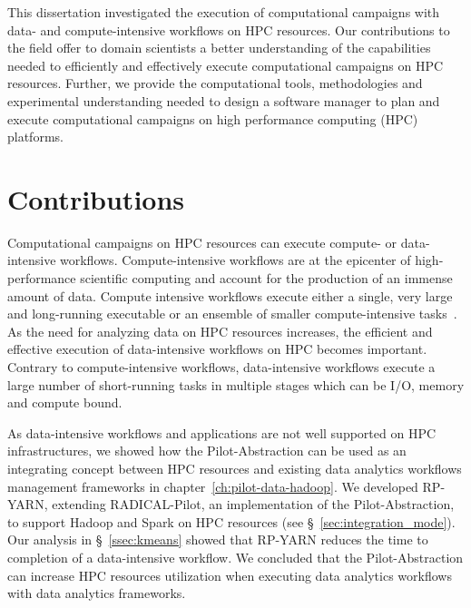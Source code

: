 
This dissertation investigated the execution of computational campaigns with
data- and compute-intensive workflows on HPC resources. Our contributions to 
the field offer to domain scientists a better understanding of the capabilities 
needed to efficiently and effectively execute computational campaigns on HPC 
resources. Further, we provide the computational tools, methodologies and 
experimental understanding needed to design a software manager to plan and 
execute computational campaigns on high performance computing (HPC) platforms.

\section{Contributions}

Computational campaigns on HPC resources can execute compute- or data- intensive
workflows. Compute-intensive workflows are at the epicenter of high-performance
scientific computing and account for the production of an immense amount of
data. Compute intensive workflows execute either a single, very large and
long-running executable or an ensemble of smaller compute-intensive
tasks~\cite{balasubramanian2018harnessing}. As the need for analyzing data on
HPC resources increases, the efficient and effective execution of data-intensive
workflows on HPC becomes important. Contrary to compute-intensive workflows,
data-intensive workflows execute a large number of short-running tasks in
multiple stages which can be I/O, memory and compute bound.

As data-intensive workflows and applications are not well supported on HPC
infrastructures, we showed how the Pilot-Abstraction can be used as an
integrating concept between HPC resources and existing data analytics workflows 
management frameworks in chapter~\ref{ch:pilot-data-hadoop}. We developed 
RP-YARN, extending RADICAL-Pilot, an implementation of the Pilot-Abstraction, 
to support Hadoop and Spark on HPC resources
(see \S~\ref{sec:integration_mode}). Our analysis in \S~\ref{ssec:kmeans} 
showed that RP-YARN reduces the time to completion of a data-intensive 
workflow. We concluded that the Pilot-Abstraction can increase HPC resources 
utilization when executing data analytics workflows with data analytics 
frameworks.

